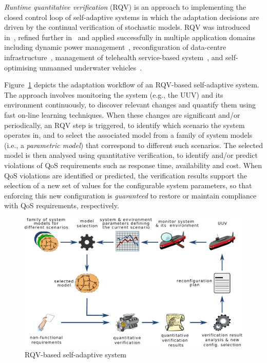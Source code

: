 
\textit{Runtime quantitative verification} (RQV) \cite{Calinescu2012:CACM} is an approach to implementing the closed control loop of self-adaptive systems in which the adaptation decisions are driven by the continual verification of stochastic models. RQV was introduced in~\cite{Calinescu2009:ICSE,Epifani2009:ICSE}, refined further in~\cite{Calinescu2011:TSE,Filieri2011:ICSE,Johnson2013:CBSE} and applied successfully in multiple application domains including dynamic power management~\cite{Calinescu2009:ICSE}, reconfiguration of data-centre infrastructure~\cite{Johnson2013:CBSE}, management of telehealth service-based system~\cite{Calinescu2011:TSE}, and self-optimising unmanned underwater vehicles~\cite{Gerasimou2014:SEAMS}.


Figure~\ref{fig:RQV} depicts the adaptation workflow of an RQV-based self-adaptive system. The approach involves monitoring the system (e.g., the UUV) and its environment continuously, to discover relevant changes and quantify them using fast on-line learning techniques. When these changes are significant and/or periodically, an RQV step is triggered, to identify which scenario the system operates in, and to select the associated model from a family of system models (i.e., a \emph{parametric model}) that correspond to different such scenarios. The selected model is then analysed using quantitative verification, to identify and/or predict violations of QoS requirements such as response time, availability and cost. When QoS violations are identified or predicted, the verification results support the selection of a new set of values for the configurable system parameters, so that enforcing this new configuration is \emph{guaranteed} to restore or maintain compliance with QoS requirements, respectively.

\begin{figure}[t]
\centering
\includegraphics[width=0.75\hsize]{figures/rqv.pdf}
\caption{RQV-based self-adaptive system}
\label{fig:RQV}

\vspace*{-2mm}
\end{figure}


